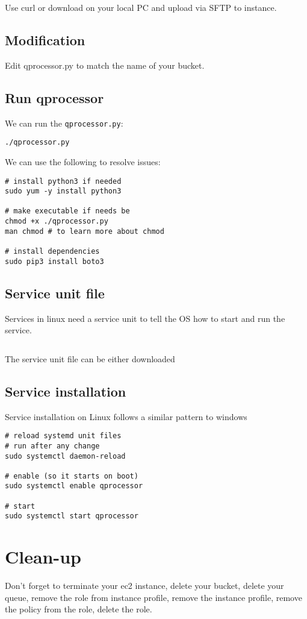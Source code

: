 Use curl or download on your local PC and upload via SFTP to instance.

\subsection{Modification}

Edit qprocessor.py to match the name of your bucket.

\subsection{Run qprocessor}

We can run the \texttt{qprocessor.py}:
\begin{verbatim}
./qprocessor.py
\end{verbatim}

We can use the following to resolve issues:
\begin{verbatim}
# install python3 if needed
sudo yum -y install python3

# make executable if needs be
chmod +x ./qprocessor.py
man chmod # to learn more about chmod

# install dependencies 
sudo pip3 install boto3
\end{verbatim}

\subsection{Service unit file}

Services in linux need a service unit to tell the OS how to start and run the service.

\inputminted{cfg}{qprocessor.service}

The service unit file can be either downloaded 

\subsection{Service installation}

Service installation on Linux follows a similar pattern to windows

\begin{verbatim}
# reload systemd unit files 
# run after any change 
sudo systemctl daemon-reload

# enable (so it starts on boot)
sudo systemctl enable qprocessor

# start
sudo systemctl start qprocessor
\end{verbatim}


\section{Clean-up}

Don't forget to terminate your ec2 instance, delete your bucket, delete your queue, remove the role from instance profile, remove the instance profile, remove the policy from the role, delete the role.

